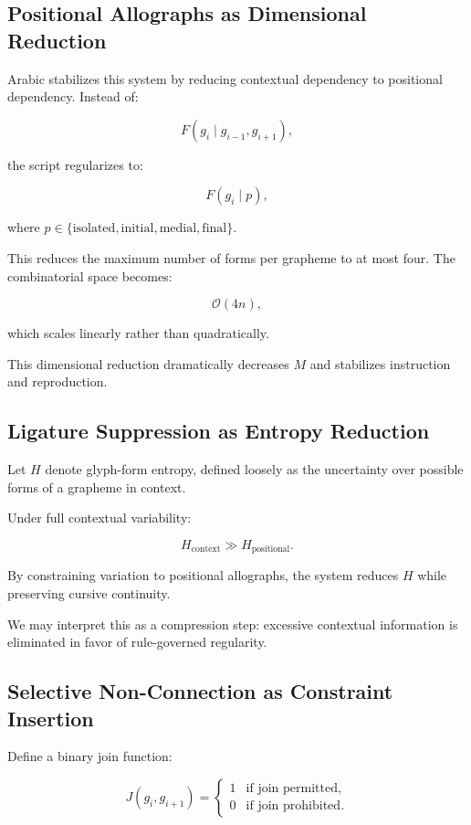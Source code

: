 \documentclass[11pt]{article}
\begin{document}
\subsection{Positional Allographs as Dimensional Reduction}

Arabic stabilizes this system by reducing contextual dependency to positional dependency. Instead of:

\[
F(g_i \mid g_{i-1}, g_{i+1}),
\]

the script regularizes to:

\[
F(g_i \mid p),
\]

where $p \in \{\text{isolated}, \text{initial}, \text{medial}, \text{final}\}$.

This reduces the maximum number of forms per grapheme to at most four. The combinatorial space becomes:

\[
\mathcal{O}(4n),
\]

which scales linearly rather than quadratically.

This dimensional reduction dramatically decreases $M$ and stabilizes instruction and reproduction.

\subsection{Ligature Suppression as Entropy Reduction}

Let $H$ denote glyph-form entropy, defined loosely as the uncertainty over possible forms of a grapheme in context.

Under full contextual variability:

\[
H_{\text{context}} \gg H_{\text{positional}}.
\]

By constraining variation to positional allographs, the system reduces $H$ while preserving cursive continuity.

We may interpret this as a compression step: excessive contextual information is eliminated in favor of rule-governed regularity.

\subsection{Selective Non-Connection as Constraint Insertion}

Define a binary join function:

\[
J(g_i, g_{i+1}) =
\begin{cases}
1 & \text{if join permitted}, \\
0 & \text{if join prohibited}.
\end{cases}
\]
\end{document}
